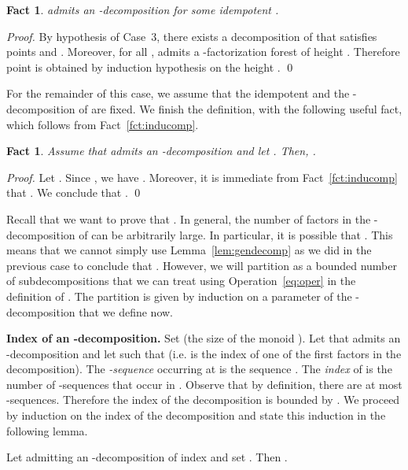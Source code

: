 \documentclass[envcountsame]{llncs}
\newtheorem{fact}[theorem]{Fact}
\begin{document}
\begin{fact} \label{fct:ebdecomp}
   admits an -decomposition for some idempotent .
\end{fact}

\begin{proof}
  By hypothesis of Case~3, there exists a decomposition 
  of  that satisfies points  and . Moreover, for all ,
   admits a -factorization forest of height . Therefore point  is obtained by induction hypothesis on the height
  . \qed
\end{proof}

For the remainder of this case, we assume that the idempotent  and the -decomposition  of  are fixed. We
finish the definition, with the following useful fact, which follows
from Fact~\ref{fct:inducomp}.

\begin{fact} \label{fct:correc}
  Assume that  admits an \emph{-decomposition}
   and let . Then, .
\end{fact}

\begin{proof}
  Let . Since , we have . Moreover, it is immediate from
  Fact~\ref{fct:inducomp} that . We conclude that . \qed
\end{proof}

Recall that we want to prove that . In general, the number of factors
 in the -decomposition of  can be arbitrarily large. In
particular, it is possible that . This
means that we cannot simply use Lemma~\ref{lem:gendecomp} as we did in
the previous case to conclude that . However, we will partition  
as a bounded number of subdecompositions that we can treat using
Operation~\eqref{eq:oper} in the definition of . The partition
is given by induction on a parameter of the -decomposition
 that we define now.

\medskip
\noindent
{\bf Index of an -decomposition.} Set  (the
size of the monoid ). Let  that admits an
-decomposition  and let  such that  (i.e.  is the index of one of the first  factors in the decomposition). The \emph{-sequence} occurring
at  is the sequence . The \emph{index} of  is the number of
-sequences that occur in . Observe that by
definition, there are at most 
-sequences. Therefore the index of the decomposition is bounded
by . We proceed by induction on the index of the
decomposition and state this induction in the following lemma.


\begin{lemma} \label{lem:inducase3}
  Let  admitting an -decomposition  of
  index  and set . Then .
\end{lemma}
\end{document}
